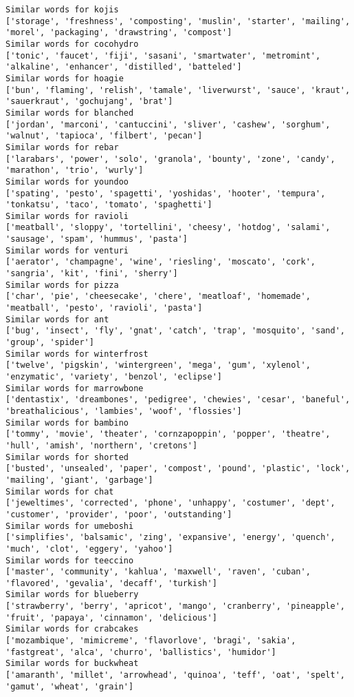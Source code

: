 \documentclass[11pt]{article}
\begin{document}
\begin{Verbatim}[commandchars=\\\{\}]
Similar words for kojis
['storage', 'freshness', 'composting', 'muslin', 'starter', 'mailing', 'morel', 'packaging', 'drawstring', 'compost']
Similar words for cocohydro
['tonic', 'faucet', 'fiji', 'sasani', 'smartwater', 'metromint', 'alkaline', 'enhancer', 'distilled', 'batteled']
Similar words for hoagie
['bun', 'flaming', 'relish', 'tamale', 'liverwurst', 'sauce', 'kraut', 'sauerkraut', 'gochujang', 'brat']
Similar words for blanched
['jordan', 'marconi', 'cantuccini', 'sliver', 'cashew', 'sorghum', 'walnut', 'tapioca', 'filbert', 'pecan']
Similar words for rebar
['larabars', 'power', 'solo', 'granola', 'bounty', 'zone', 'candy', 'marathon', 'trio', 'wurly']
Similar words for youndoo
['spating', 'pesto', 'spagetti', 'yoshidas', 'hooter', 'tempura', 'tonkatsu', 'taco', 'tomato', 'spaghetti']
Similar words for ravioli
['meatball', 'sloppy', 'tortellini', 'cheesy', 'hotdog', 'salami', 'sausage', 'spam', 'hummus', 'pasta']
Similar words for venturi
['aerator', 'champagne', 'wine', 'riesling', 'moscato', 'cork', 'sangria', 'kit', 'fini', 'sherry']
Similar words for pizza
['char', 'pie', 'cheesecake', 'chere', 'meatloaf', 'homemade', 'meatball', 'pesto', 'ravioli', 'pasta']
Similar words for ant
['bug', 'insect', 'fly', 'gnat', 'catch', 'trap', 'mosquito', 'sand', 'group', 'spider']
Similar words for winterfrost
['twelve', 'pigskin', 'wintergreen', 'mega', 'gum', 'xylenol', 'enzymatic', 'variety', 'benzol', 'eclipse']
Similar words for marrowbone
['dentastix', 'dreambones', 'pedigree', 'chewies', 'cesar', 'baneful', 'breathalicious', 'lambies', 'woof', 'flossies']
Similar words for bambino
['tommy', 'movie', 'theater', 'cornzapoppin', 'popper', 'theatre', 'hull', 'amish', 'northern', 'cretons']
Similar words for shorted
['busted', 'unsealed', 'paper', 'compost', 'pound', 'plastic', 'lock', 'mailing', 'giant', 'garbage']
Similar words for chat
['jeweltimes', 'corrected', 'phone', 'unhappy', 'costumer', 'dept', 'customer', 'provider', 'poor', 'outstanding']
Similar words for umeboshi
['simplifies', 'balsamic', 'zing', 'expansive', 'energy', 'quench', 'much', 'clot', 'eggery', 'yahoo']
Similar words for teeccino
['master', 'community', 'kahlua', 'maxwell', 'raven', 'cuban', 'flavored', 'gevalia', 'decaff', 'turkish']
Similar words for blueberry
['strawberry', 'berry', 'apricot', 'mango', 'cranberry', 'pineapple', 'fruit', 'papaya', 'cinnamon', 'delicious']
Similar words for crabcakes
['mozambique', 'mimicreme', 'flavorlove', 'bragi', 'sakia', 'fastgreat', 'alca', 'churro', 'ballistics', 'humidor']
Similar words for buckwheat
['amaranth', 'millet', 'arrowhead', 'quinoa', 'teff', 'oat', 'spelt', 'gamut', 'wheat', 'grain']

\end{Verbatim}
\end{document}
